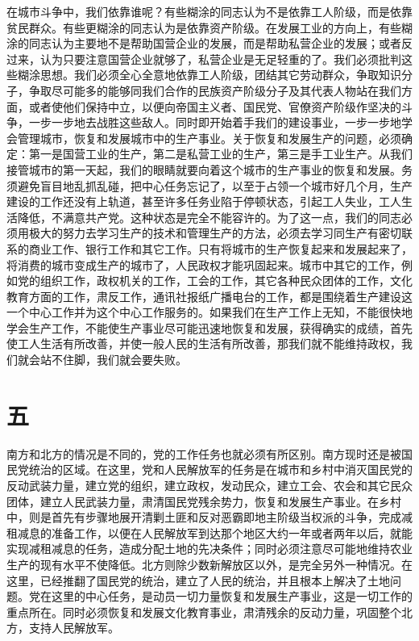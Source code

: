 在城市斗争中，我们依靠谁呢？有些糊涂的同志认为不是依靠工人阶级，而是依靠贫民群众。有些更糊涂的同志认为是依靠资产阶级。在发展工业的方向上，有些糊涂的同志认为主要地不是帮助国营企业的发展，而是帮助私营企业的发展；或者反过来，认为只要注意国营企业就够了，私营企业是无足轻重的了。我们必须批判这些糊涂思想。我们必须全心全意地依靠工人阶级，团结其它劳动群众，争取知识分子，争取尽可能多的能够同我们合作的民族资产阶级分子及其代表人物站在我们方面，或者使他们保持中立，以便向帝国主义者、国民党、官僚资产阶级作坚决的斗争，一步一步地去战胜这些敌人。同时即开始着手我们的建设事业，一步一步地学会管理城市，恢复和发展城市中的生产事业。关于恢复和发展生产的问题，必须确定：第一是国营工业的生产，第二是私营工业的生产，第三是手工业生产。从我们接管城市的第一天起，我们的眼睛就要向着这个城市的生产事业的恢复和发展。务须避免盲目地乱抓乱碰，把中心任务忘记了，以至于占领一个城市好几个月，生产建设的工作还没有上轨道，甚至许多任务业陷于停顿状态，引起工人失业，工人生活降低，不满意共产党。这种状态是完全不能容许的。为了这一点，我们的同志必须用极大的努力去学习生产的技术和管理生产的方法，必须去学习同生产有密切联系的商业工作、银行工作和其它工作。只有将城市的生产恢复起来和发展起来了，将消费的城市变成生产的城市了，人民政权才能巩固起来。城市中其它的工作，例如党的组织工作，政权机关的工作，工会的工作，其它各种民众团体的工作，文化教育方面的工作，肃反工作，通讯社报纸广播电台的工作，都是围绕着生产建设这一个中心工作并为这个中心工作服务的。如果我们在生产工作上无知，不能很快地学会生产工作，不能使生产事业尽可能迅速地恢复和发展，获得确实的成绩，首先使工人生活有所改善，并使一般人民的生活有所改善，那我们就不能维持政权，我们就会站不住脚，我们就会要失败。

\section*{五}

南方和北方的情况是不同的，党的工作任务也就必须有所区别。南方现时还是被国民党统治的区域。在这里，党和人民解放军的任务是在城市和乡村中消灭国民党的反动武装力量，建立党的组织，建立政权，发动民众，建立工会、农会和其它民众团体，建立人民武装力量，肃清国民党残余势力，恢复和发展生产事业。在乡村中，则是首先有步骤地展开清剿土匪和反对恶霸即地主阶级当权派的斗争，完成减租减息的准备工作，以便在人民解放军到达那个地区大约一年或者两年以后，就能实现减租减息的任务，造成分配土地的先决条件；同时必须注意尽可能地维持农业生产的现有水平不使降低。北方则除少数新解放区以外，是完全另外一种情况。在这里，已经推翻了国民党的统治，建立了人民的统治，并且根本上解决了土地问题。党在这里的中心任务，是动员一切力量恢复和发展生产事业，这是一切工作的重点所在。同时必须恢复和发展文化教育事业，肃清残余的反动力量，巩固整个北方，支持人民解放军。

